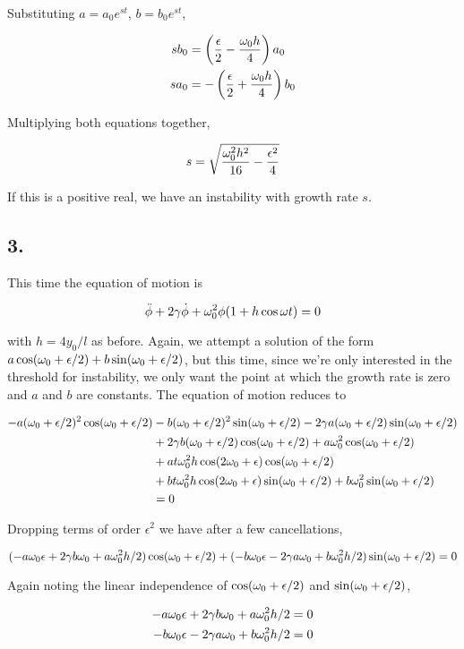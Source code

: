 \documentclass[12pt]{article}
\begin{document}
Substituting  \(a = a_0e^{st}\), \(b = b_0e^{st}\),

\begin{align*}
sb_0 &= \left( \frac{\epsilon}{2}-\frac{\omega_0 h}{4} \right)a_0\\
sa_0 &= -\left( \frac{\epsilon}{2}+\frac{\omega_0 h}{4} \right)b_0
\end{align*}

Multiplying both equations together, 

\[s = \sqrt{\frac{\omega_0^2 h^2}{16}-\frac{\epsilon^2}{4}}
\]

If this is a positive real, we have an instability with growth rate \(s\).

\subsection*{3.}

This time the equation of motion is

\[ \ddot{\phi} + 2\gamma\dot{\phi} + \omega_0^2\phi(1+h\cos\omega t)=0
\]

with \(h = 4y_0/l\) as before. Again, we attempt a solution of the form \(a\cos(\omega_0 + \epsilon/2) + b\sin(\omega_0 + \epsilon/2)\), but this time, since we're only interested in the threshold for instability, we only want the point at which the growth rate is zero and \(a\) and \(b\) are constants. The equation of motion reduces to

\newcommand{\wne}{(\wn+\epsilon /2)}

\begin{align*}
-a\wne ^2\coswne &-b\wne^2\sinwne -2\gamma a\wne\sinwne \\
  &+2\gamma b\wne\coswne+a\wn^2\coswne \\
  &+at\wn^2 h\cos (2\wn + \epsilon)\coswne \\
  &+ bt\wn^2 h\cos (2\wn + \epsilon)\sinwne + b\wn^2 \sinwne \\
  &=0
\end{align*}

Dropping terms of order \(\epsilon^2\) we have after a few cancellations,

\[(-a\omega_0\epsilon+2\gamma b\omega_0 + a\omega_0^2h/2)\cos(\omega_0 + \epsilon/2) + (-b\omega_0\epsilon - 2\gamma a\omega_0 + b\omega_0^2h/2)\sin(\omega_0 + \epsilon/2)=0
\]

Again noting the linear independence of \(\cos(\omega_0 + \epsilon/2)\) and \(\sin(\omega_0 + \epsilon/2)\),

\begin{align*}
-a\omega_0\epsilon+2\gamma b\omega_0 + a\omega_0^2h/2 &= 0 \\
-b\omega_0\epsilon - 2\gamma a\omega_0 + b\omega_0^2h/2 &= 0 
\end{align*}
\end{document}
